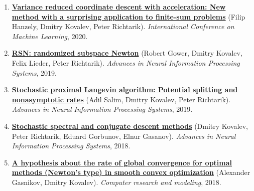 \begin{enumerate}
\item
\textbf{\href{https://proceedings.mlr.press/v119/hanzely20b.html}{Variance reduced coordinate descent with acceleration: New method with a surprising application to finite-sum problems}} (Filip Hanzely, Dmitry Kovalev, Peter Richtarik). \textit{International Conference on Machine Learning}, 2020.
\item
\textbf{\href{https://proceedings.neurips.cc/paper_files/paper/2019/hash/bc6dc48b743dc5d013b1abaebd2faed2-Abstract.html}{RSN: randomized subspace Newton}} (Robert Gower, Dmitry Kovalev, Felix Lieder, Peter Richtarik). \textit{Advances in Neural Information Processing Systems}, 2019.
\item
\textbf{\href{https://proceedings.neurips.cc/paper_files/paper/2019/hash/6a8018b3a00b69c008601b8becae392b-Abstract.html}{Stochastic proximal Langevin algorithm: Potential splitting and nonasymptotic rates}} (Adil Salim, Dmitry Kovalev, Peter Richtarik). \textit{Advances in Neural Information Processing Systems}, 2019.
\item
\textbf{\href{https://proceedings.neurips.cc/paper_files/paper/2018/hash/e721a54a8cf18c8543d44782d9ef681f-Abstract.html}{Stochastic spectral and conjugate descent methods}} (Dmitry Kovalev, Peter Richtarik, Eduard Gorbunov, Elnur Gasanov). \textit{Advances in Neural Information Processing Systems}, 2018.
\item
\textbf{\href{https://crm-en.ics.org.ru/journal/article/references/2685/}{A hypothesis about the rate of global convergence for optimal methods (Newton’s type) in smooth convex optimization}} (Alexander Gasnikov, Dmitry Kovalev). \textit{Computer research and modeling}, 2018.
\end{enumerate}

